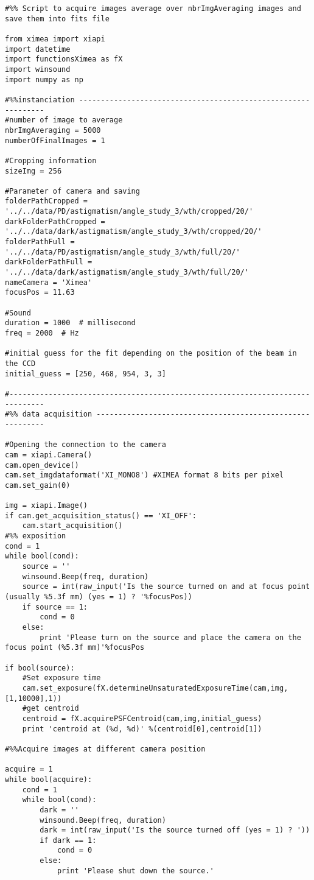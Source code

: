 \begin{lstlisting}
#%% Script to acquire images average over nbrImgAveraging images and save them into fits file

from ximea import xiapi
import datetime
import functionsXimea as fX
import winsound
import numpy as np

#%%instanciation --------------------------------------------------------------
#number of image to average
nbrImgAveraging = 5000
numberOfFinalImages = 1

#Cropping information
sizeImg = 256

#Parameter of camera and saving
folderPathCropped = '../../data/PD/astigmatism/angle_study_3/wth/cropped/20/'
darkFolderPathCropped = '../../data/dark/astigmatism/angle_study_3/wth/cropped/20/'
folderPathFull = '../../data/PD/astigmatism/angle_study_3/wth/full/20/'
darkFolderPathFull = '../../data/dark/astigmatism/angle_study_3/wth/full/20/'
nameCamera = 'Ximea'
focusPos = 11.63

#Sound
duration = 1000  # millisecond
freq = 2000  # Hz

#initial guess for the fit depending on the position of the beam in the CCD
initial_guess = [250, 468, 954, 3, 3]

#------------------------------------------------------------------------------
#%% data acquisition ----------------------------------------------------------

#Opening the connection to the camera
cam = xiapi.Camera()
cam.open_device()
cam.set_imgdataformat('XI_MONO8') #XIMEA format 8 bits per pixel
cam.set_gain(0)

img = xiapi.Image()
if cam.get_acquisition_status() == 'XI_OFF':
    cam.start_acquisition()
#%% exposition
cond = 1
while bool(cond):
    source = ''
    winsound.Beep(freq, duration)
    source = int(raw_input('Is the source turned on and at focus point (usually %5.3f mm) (yes = 1) ? '%focusPos))
    if source == 1:
        cond = 0
    else:
        print 'Please turn on the source and place the camera on the focus point (%5.3f mm)'%focusPos

if bool(source):
    #Set exposure time
    cam.set_exposure(fX.determineUnsaturatedExposureTime(cam,img,[1,10000],1))
    #get centroid
    centroid = fX.acquirePSFCentroid(cam,img,initial_guess)
    print 'centroid at (%d, %d)' %(centroid[0],centroid[1])

#%%Acquire images at different camera position

acquire = 1
while bool(acquire):
    cond = 1
    while bool(cond):
        dark = ''
        winsound.Beep(freq, duration)
        dark = int(raw_input('Is the source turned off (yes = 1) ? '))
        if dark == 1:
            cond = 0
        else:
            print 'Please shut down the source.'


\end{lstlisting}
